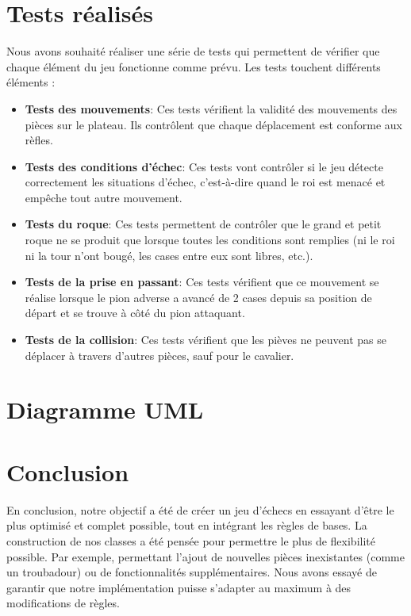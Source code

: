 \documentclass[12pt]{article}
\begin{document}
    \section{Tests réalisés}
    Nous avons souhaité réaliser une série de tests qui permettent de vérifier que chaque élément du jeu fonctionne comme prévu. Les tests touchent différents éléments :

    \begin{itemize}
        \item \textbf{Tests des mouvements}: Ces tests vérifient la validité des mouvements des pièces sur le plateau. Ils contrôlent que chaque déplacement est conforme aux rèfles.
        \item \textbf{Tests des conditions d'échec}: Ces tests vont contrôler si le jeu détecte correctement les situations d'échec, c'est-à-dire quand le roi est menacé et empêche tout autre mouvement.
        \item \textbf{Tests du roque}: Ces tests permettent de contrôler que le grand et petit roque ne se produit que lorsque toutes les conditions sont remplies (ni le roi ni la tour n'ont bougé, les cases entre eux sont libres, etc.).
        \item \textbf{Tests de la prise en passant}: Ces tests vérifient que ce mouvement se réalise lorsque le pion adverse a avancé de 2 cases depuis sa position de départ et se trouve à côté du pion attaquant.
        \item \textbf{Tests de la collision}: Ces tests vérifient que les pièves ne peuvent pas se déplacer à travers d'autres pièces, sauf pour le cavalier.

    \end{itemize}

    \newpage
    \section{Diagramme UML}
    \newpage

    \section{Conclusion}

    En conclusion, notre objectif a été de créer un jeu d'échecs en essayant d'être le plus optimisé et complet possible, tout en intégrant les règles de bases. La construction de nos classes a été pensée pour permettre le plus de flexibilité possible. Par exemple, permettant l'ajout de nouvelles pièces inexistantes (comme un troubadour) ou de fonctionnalités supplémentaires. Nous avons essayé de garantir que notre implémentation puisse s'adapter au maximum à des modifications de règles.
\end{document}

